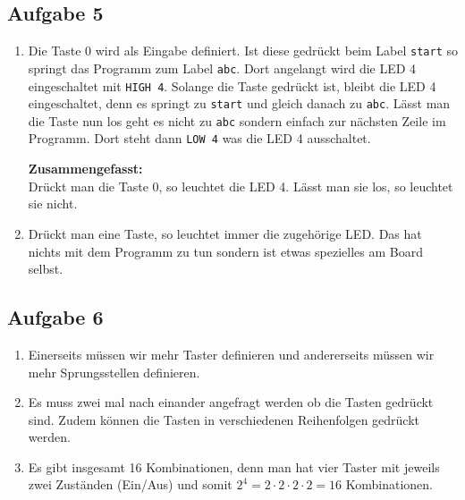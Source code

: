\subsection{Aufgabe 5}
\begin{enumerate}[label=(\alph*)]
	\item Die Taste 0 wird als Eingabe definiert. Ist diese gedrückt
	beim Label \lstinline{start} so springt das Programm zum Label 
	\lstinline{abc}. Dort angelangt wird die LED 4 eingeschaltet mit
	\lstinline{HIGH 4}. Solange die Taste gedrückt ist, bleibt die
	LED 4 eingeschaltet, denn es springt zu \lstinline{start} und
	gleich danach zu \lstinline{abc}. Lässt man die Taste nun los
	geht es nicht zu \lstinline{abc} sondern einfach zur nächsten Zeile
	im Programm. Dort steht dann \lstinline{LOW 4} was die LED 4
	ausschaltet.

	\textbf{Zusammengefasst:}\\
	Drückt man die Taste 0, so leuchtet die LED 4.
	Lässt man sie los, so leuchtet sie nicht.
	\item Drückt man eine Taste, so leuchtet immer die zugehörige LED.
	Das hat nichts mit dem Programm zu tun sondern ist etwas spezielles
	am Board selbst.
\end{enumerate}
\fi

\ifteacher
\newpage
\subsection{Aufgabe 6}
\begin{enumerate}[label=(\alph*)]
	\item Einerseits müssen wir mehr Taster definieren und andererseits
	müssen wir mehr Sprungsstellen definieren.
	
	\item Es muss zwei mal nach einander angefragt werden ob die Tasten
	gedrückt sind. Zudem können die Tasten in verschiedenen Reihenfolgen
	gedrückt werden.
	
	\item Es gibt insgesamt 16 Kombinationen, denn man hat vier Taster
	mit jeweils zwei Zuständen (Ein/Aus) und somit 
	$2^4=2 \cdot 2 \cdot 2 \cdot 2=16$
	Kombinationen.
\end{enumerate}
\fi

\ifteacher
\newpage
